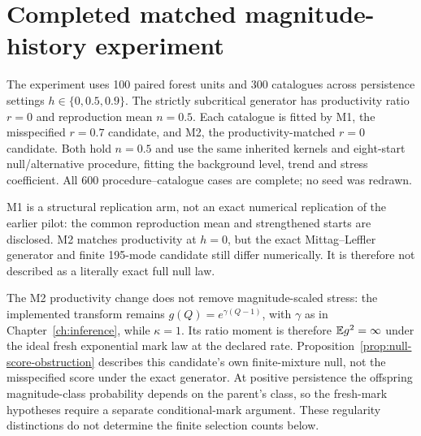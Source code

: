\section{Completed matched magnitude-history experiment}

\label{sec:s02-completed}

The experiment uses 100 paired forest units and 300 catalogues across persistence settings $h\in\{0,0.5,0.9\}$. The strictly subcritical generator has productivity ratio $r=0$ and reproduction mean $n=0.5$. Each catalogue is fitted by M1, the misspecified $r=0.7$ candidate, and M2, the productivity-matched $r=0$ candidate. Both hold $n=0.5$ and use the same inherited kernels and eight-start null/alternative procedure, fitting the background level, trend and stress coefficient. All 600 procedure--catalogue cases are complete; no seed was redrawn.

M1 is a structural replication arm, not an exact numerical replication of the earlier pilot: the common reproduction mean and strengthened starts are disclosed. M2 matches productivity at $h=0$, but the exact Mittag--Leffler generator and finite 195-mode candidate still differ numerically. It is therefore not described as a literally exact full null law.

The M2 productivity change does not remove magnitude-scaled stress: the implemented transform remains \(g(Q)=e^{\gamma(Q-1)}\), with \(\gamma\) as in Chapter~\ref{ch:inference}, while \(\kappa=1\). Its ratio moment is therefore \(\mathbb{E} g^2=\infty\) under the ideal fresh exponential mark law at the declared rate. Proposition~\ref{prop:null-score-obstruction} describes this candidate's own finite-mixture null, not the misspecified score under the exact generator. At positive persistence the offspring magnitude-class probability depends on the parent's class, so the fresh-mark hypotheses require a separate conditional-mark argument. These regularity distinctions do not determine the finite selection counts below.

